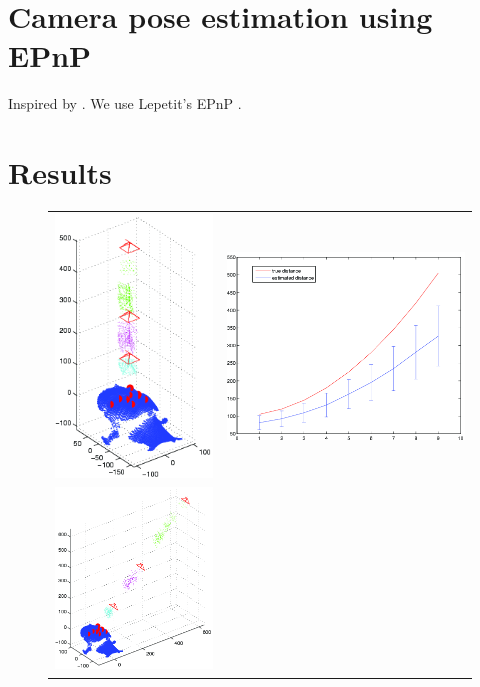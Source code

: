 \documentclass[runningheads]{llncs}
\begin{document}
\section{Camera pose estimation using EPnP}
Inspired by \cite{ohayon2006robust}.  We use Lepetit's EPnP \cite{lepetit2009epnp}.

\section{Results}

\begin{figure}[ht]
\begin{tabular}{cc}
\includegraphics[width=.45\linewidth]{../resources/figures/cameraloc_frontal.png} &
\includegraphics[width=.45\linewidth]{../resources/figures/errorbar_frontal.png} \\
\includegraphics[width=.45\linewidth]{../resources/figures/cameraloc_3q.png} &

\end{tabular}
\end{figure}
\end{document}
